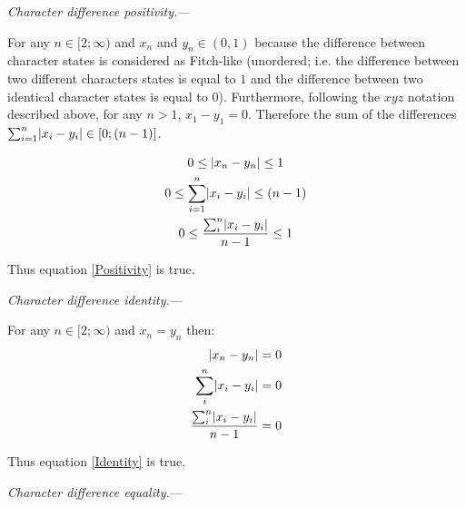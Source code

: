 \documentclass[12pt,letterpaper]{article}
\DeclarePairedDelimiter\abs{\lvert}{\rvert}%
\renewcommand{\subsection}[1]{%
\bigskip
\begin{center}
\begin{large}
\normalfont\itshape #1
\end{large}
\end{center}}
\renewcommand{\subsection}[1]{%
\vspace{2ex}
\noindent
\textit{#1.}---}
\begin{document}
\newpage

\subsection{Character difference positivity}

For any $n \in [2;\infty)$ and $x_{n}$ and $y_{n} \in (0,1)$ because the difference between character states is considered as Fitch-like (unordered; i.e. the difference between two different characters states is equal to $1$ and the difference between two identical character states is equal to $0$).
Furthermore, following the $xyz$ notation described above, for any $n > 1$, $x_{1}-y_{1}=0$.
Therefore the sum of the differences $\sum_{i=1}^{n}\abs{x_{i}-y_{i}} \in [0;(n-1)]$.

\begin{equation}
    \label{positive_demo}
    \begin{gathered}
    0 \leq  \abs{x_{n}-y_{n}} \leq 1\\
    0 \leq  \sum_{i=1}^{n}\abs{x_{i}-y_{i}} \leq (n-1)\\
    0 \leq  \frac{\sum_{i}^{n}\abs{x_{i}-y_{i}}}{n-1} \leq 1\\
    \end{gathered}
\end{equation}

Thus equation \ref{Positivity} is true.

\newpage

\subsection{Character difference identity}

For any $n \in [2;\infty)$ and $x_{n} = y_{n}$ then:
\begin{equation}
    \label{identitydemo}
    \begin{aligned}
    \abs{x_{n}-y_{n}} &= 0\\
    \sum_{i}^{n}\abs{x_{i}-y_{i}} &= 0\\
    \frac{\sum_{i}^{n}\abs{x_{i}-y_{i}}}{n-1} &= 0\\
    \end{aligned}
\end{equation}

Thus equation \ref{Identity} is true.

\subsection{Character difference equality}
\end{document}
